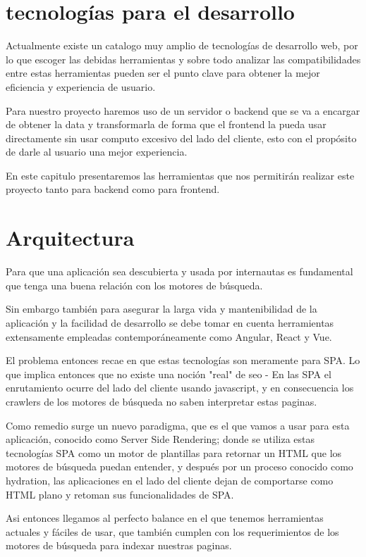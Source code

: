 \section{tecnologías para el desarrollo}

Actualmente existe un catalogo muy amplio de tecnologías de desarrollo web, por lo que escoger las debidas herramientas y sobre todo analizar las compatibilidades entre estas herramientas pueden ser el punto clave para obtener la mejor eficiencia y experiencia de usuario. 

Para nuestro proyecto haremos uso de un servidor o backend que se va a encargar de obtener la data y transformarla de forma que el frontend la pueda usar directamente sin usar computo excesivo del lado del cliente, esto con el propósito de darle al usuario una mejor experiencia. 

En este capitulo presentaremos las herramientas que nos permitirán realizar este proyecto tanto para backend como para frontend.

\section{Arquitectura}

Para que una aplicación sea descubierta y usada por internautas es fundamental que tenga una buena relación con los motores de búsqueda.

Sin embargo también para asegurar la larga vida y mantenibilidad de la aplicación y la facilidad de desarrollo se debe tomar en cuenta herramientas extensamente empleadas contemporáneamente como Angular, React y Vue.

El problema entonces recae en que estas tecnologías son meramente para SPA. Lo que implica entonces que no existe una noción "real" de seo - En las SPA el enrutamiento ocurre del lado del cliente usando javascript, y en consecuencia los crawlers de los motores de búsqueda no saben interpretar estas paginas.

Como remedio surge un nuevo paradigma, que es el que vamos a usar para esta aplicación, conocido como Server Side Rendering; donde se utiliza estas tecnologías SPA como un motor de plantillas para retornar un HTML que los motores de búsqueda puedan entender, y después por un proceso conocido como hydration, las aplicaciones en el lado del cliente dejan de comportarse como HTML plano y retoman sus funcionalidades de SPA.

Asi entonces llegamos al perfecto balance en el que tenemos herramientas actuales y fáciles de usar, que también cumplen con los requerimientos de los motores de búsqueda para indexar nuestras paginas.

